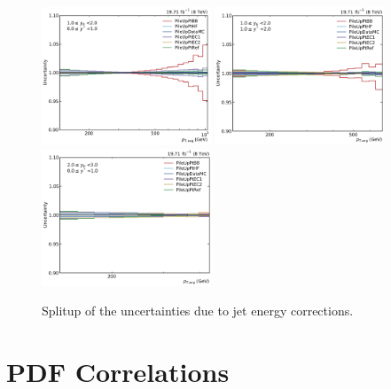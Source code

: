 \begin{figure}[htbp]
    \includegraphics[width=0.45\textwidth]{figures/measurement/jec_relunc_5_yb1ys0.pdf}
    \includegraphics[width=0.45\textwidth]{figures/measurement/jec_relunc_5_yb1ys1.pdf}\hfill
    \includegraphics[width=0.45\textwidth]{figures/measurement/jec_relunc_5_yb2ys0.pdf}
    \caption{Splitup of the uncertainties due to jet energy corrections.}
    \label{fig:jec_relunc_5}
\end{figure}


\section{PDF Correlations}

